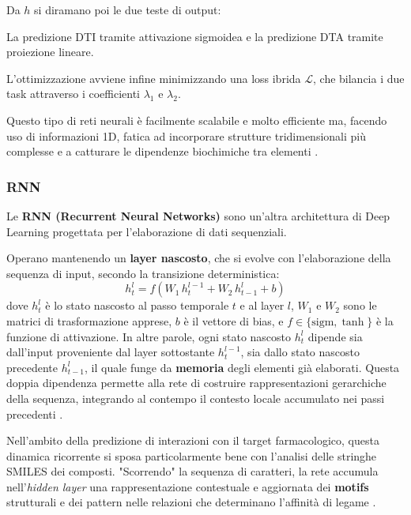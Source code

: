 Da $h$ si diramano poi le due teste di output:

La predizione DTI tramite attivazione sigmoidea e la predizione DTA tramite proiezione lineare.

L'ottimizzazione avviene infine minimizzando una loss ibrida $\mathcal{L}$, che
bilancia i due task attraverso i coefficienti $\lambda_1$
e $\lambda_2$.

Questo tipo di reti neurali è facilmente scalabile e molto efficiente
ma, facendo uso di informazioni 1D, fatica ad incorporare
strutture tridimensionali più complesse e a catturare le dipendenze
biochimiche tra elementi \cite{houDGCADTADeepGraph2025}.

\subsubsection{RNN}
Le \textbf{RNN (Recurrent Neural Networks)} sono un'altra architettura
di Deep Learning progettata per l'elaborazione di dati sequenziali.

Operano mantenendo un \textbf{layer nascosto}, che si evolve con
l'elaborazione della sequenza di input, secondo la transizione deterministica:
\begin{equation}
    h_t^l = f\!\left(W_1\, h_t^{l-1} + W_2\, h_{t-1}^l + b\right)
\end{equation}
dove $h_t^l$ è lo stato nascosto al passo temporale $t$ e al layer $l$,
$W_1$ e $W_2$ sono le matrici di trasformazione apprese, $b$ è il vettore di bias, e $f \in
\{\text{sigm}, \tanh\}$ è la funzione di attivazione.
In altre parole, ogni stato nascosto $h_t^l$ dipende sia dall'input proveniente dal
layer sottostante $h_t^{l-1}$, sia dallo stato nascosto precedente
$h_{t-1}^l$, il quale funge da \textbf{memoria} degli elementi già
elaborati. Questa doppia dipendenza permette alla rete di costruire
rappresentazioni gerarchiche della sequenza, integrando al contempo il
contesto locale accumulato nei passi precedenti \cite{zarembaRecurrentNeuralNetwork2015}.

Nell'ambito della predizione di interazioni con il target farmacologico, questa dinamica ricorrente si sposa particolarmente bene con l'analisi delle stringhe SMILES dei composti. "Scorrendo" la sequenza di caratteri, la rete accumula nell'\textit{hidden layer} una rappresentazione contestuale e aggiornata dei \textbf{motifs} strutturali e dei pattern nelle
relazioni che determinano l'affinità di legame \cite{odugbemiArtificialIntelligenceAntidiabetic2024}.

